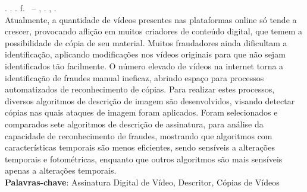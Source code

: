 
\begin{resumo}[RESUMO]
\begin{SingleSpacing}

\imprimirautorcitacao. \imprimirtitulo. \imprimirdata. \pageref {LastPage} f. \imprimirprojeto\ – \imprimirprograma, \imprimirinstituicao. \imprimirlocal, \imprimirdata.\\

Atualmente, a quantidade de vídeos presentes nas plataformas online só tende a crescer, provocando aflição em muitos criadores de conteúdo digital, que temem a possibilidade de cópia de seu material.  Muitos fraudadores ainda dificultam a identificação, aplicando modificações nos vídeos originais para que não sejam identificados tão facilmente. O número elevado de vídeos na internet torna a identificação de fraudes manual ineficaz, abrindo espaço para processos automatizados de reconhecimento de cópias. Para realizar estes processos, diversos algoritmos de descrição de imagem são desenvolvidos, visando detectar cópias nas quais ataques de imagem foram aplicados. Foram selecionados e comparados sete algoritmos de descrição de assinatura, para análise da capacidade de reconhecimento de fraudes, mostrando que algoritmos com características temporais são menos eficientes, sendo sensíveis a alterações temporais e fotométricas, enquanto que outros algoritmos são mais sensíveis apenas a alterações temporais. \\

\textbf{Palavras-chave}: Assinatura Digital de Vídeo, Descritor, Cópias de Vídeos

\end{SingleSpacing}
\end{resumo}


